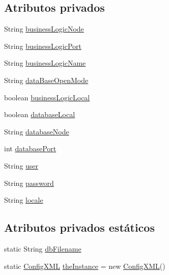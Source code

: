 \subsection*{Atributos privados}
\begin{DoxyCompactItemize}
\item 
String \mbox{\hyperlink{classconfiguration_1_1_config_x_m_l_a8eaef059e5c5b7dc23331ba72c04eb59}{business\+Logic\+Node}}
\item 
String \mbox{\hyperlink{classconfiguration_1_1_config_x_m_l_ac679ff78a18d6f012cb613d8e8c7ac41}{business\+Logic\+Port}}
\item 
String \mbox{\hyperlink{classconfiguration_1_1_config_x_m_l_ad0228d23b69947a3e6ad84db4d893369}{business\+Logic\+Name}}
\item 
String \mbox{\hyperlink{classconfiguration_1_1_config_x_m_l_afaa301de70783638240f5a9a147f615f}{data\+Base\+Open\+Mode}}
\item 
boolean \mbox{\hyperlink{classconfiguration_1_1_config_x_m_l_ab30a83d21460a743a7a86955de08da3a}{business\+Logic\+Local}}
\item 
boolean \mbox{\hyperlink{classconfiguration_1_1_config_x_m_l_a6ca52a37fbb4b0994aeb388df59a275f}{database\+Local}}
\item 
String \mbox{\hyperlink{classconfiguration_1_1_config_x_m_l_a71b31518e099bee7f0eefa043b38d706}{database\+Node}}
\item 
int \mbox{\hyperlink{classconfiguration_1_1_config_x_m_l_a3766a24ed4f1ffda3f6af14b90100656}{database\+Port}}
\item 
String \mbox{\hyperlink{classconfiguration_1_1_config_x_m_l_a79e9a3b8602620dbb873ba491f47164a}{user}}
\item 
String \mbox{\hyperlink{classconfiguration_1_1_config_x_m_l_a719187d1ff6398218cb8f6d7b0f53763}{password}}
\item 
String \mbox{\hyperlink{classconfiguration_1_1_config_x_m_l_a34c81c18f387adacbf595cee3c0229b0}{locale}}
\end{DoxyCompactItemize}
\subsection*{Atributos privados estáticos}
\begin{DoxyCompactItemize}
\item 
static String \mbox{\hyperlink{classconfiguration_1_1_config_x_m_l_a421b678aff5893a1927f5257b1becb14}{db\+Filename}}
\item 
static \mbox{\hyperlink{classconfiguration_1_1_config_x_m_l}{Config\+X\+ML}} \mbox{\hyperlink{classconfiguration_1_1_config_x_m_l_a7993e8ab35ee8854e832e85bafe85964}{the\+Instance}} = new \mbox{\hyperlink{classconfiguration_1_1_config_x_m_l}{Config\+X\+ML}}()
\end{DoxyCompactItemize}



